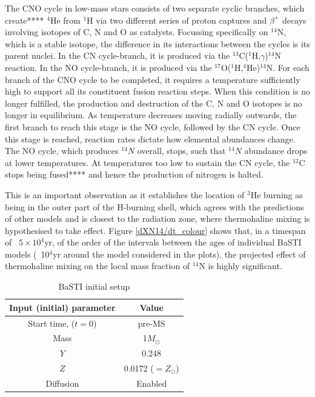 \documentclass[12pt, a4paper]{report}
\begin{document}
The CNO cycle in low-mass stars consists of two separate cyclic branches, which create**** $^{4}$He from $^{1}$H via two different series of proton captures and $\beta ^{+}$ decays involving isotopes of C, N and O as catalysts. Focussing specifically on $^{14}$N, which is a stable isotope, the difference in its interactions between the cycles is its parent nuclei. In the CN cycle-branch, it is produced via the $^{13}$C($^{1}$H,$\gamma$)$^{14}$N reaction. In the NO cycle-branch, it is produced via the $^{17}$O($^{1}$H,$^{4}$He)$^{14}$N. For each branch of the CNO cycle to be completed, it requires a temperature sufficiently high to support all its constituent fusion reaction steps. When this condition is no longer fulfilled, the production and destruction of the C, N and O isotopes is no longer in equilibrium. As temperature decreases moving radially outwards, the first branch to reach this stage is the NO cycle, followed by the CN cycle. Once this stage is reached, reaction rates dictate how elemental abundances change. The NO cycle, which produces $^{14}N$ overall, stops, such that $^{14}N$ abundance drops at lower temperatures. At temperatures too low to sustain the CN cycle, the $^{12}$C stops being fused**** and hence the production of nitrogen is halted.

This is an important observation as it establishes the location of $^{3}$He burning as being in the outer part of the H-burning shell, which agrees with the predictions of other models and is closest to the radiation zone, where thermohaline mixing is hypothesised to take effect. Figure \ref{dXN14/dt_colour} shows that, in a timespan of ~$5 \times 10^{4}$yr, of the order of the intervals between the ages of individual BaSTI models (~10$^{4}$yr around the model considered in the plots), the projected effect of thermohaline mixing on the local mass fraction of $^{14}$N is highly significant.


\begin{table}
\begin{tabular}{cc}
\hline
Input (initial) parameter & Value \\
\hline
Start time, ($t=0$) & pre-MS \\
Mass & 1$M_{\odot}$ \\
$Y$ & 0.248 \\
$Z$ & 0.0172 ($=Z_{\odot}$) \\
Diffusion & Enabled \\
\hline
\end{tabular}
\caption{BaSTI initial setup}
\label{basti_params}
\end{table}
\end{document}
